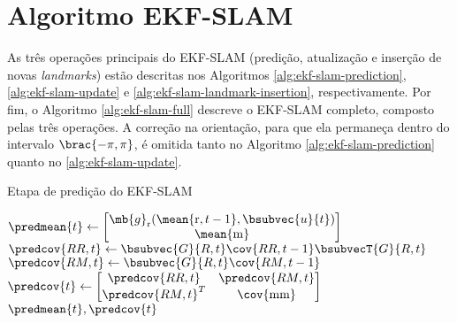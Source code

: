 \section{Algoritmo EKF-SLAM}
\label{app:alg-ekf-slam}
As três operações principais do EKF-SLAM (predição, atualização e inserção de novas \textit{landmarks}) estão descritas nos Algoritmos \ref{alg:ekf-slam-prediction}, \ref{alg:ekf-slam-update} e \ref{alg:ekf-slam-landmark-insertion}, respectivamente. Por fim, o Algoritmo \ref{alg:ekf-slam-full} descreve o EKF-SLAM completo, composto pelas três operações. A correção na orientação, para que ela permaneça dentro do 
intervalo $\brac{-\pi, \pi}$, é omitida tanto no Algoritmo \ref{alg:ekf-slam-prediction} quanto no \ref{alg:ekf-slam-update}.

\begin{algorithm}[h]
  \caption{Etapa de predição do EKF-SLAM}
  \label{alg:ekf-slam-prediction}
\begin{algorithmic}[1]
  \State $\predmean{t} \gets \begin{bmatrix}
    \mb{g}_\mathrm{r}(\mean{\mathrm{r},t-1}, \bsubvec{u}{t}) \\ \mean{\mathrm{m}}
  \end{bmatrix}$
  \State $\predcov{RR,t} \gets \bsubvec{G}{R, t}\cov{RR, t-1} \bsubvecT{G}{R,t}$
  \State $\predcov{RM, t} \gets \bsubvec{G}{R, t} \cov{RM, t-1}$
  \State $\predcov{t} \gets \begin{bmatrix}
    \predcov{RR, t} & \predcov{RM, t} \\
    \predcov{RM, t}^T & \cov{\mathrm{mm}}
  \end{bmatrix}$
  \State \Return $\predmean{t}, \predcov{t}$
\EndProcedure
\end{algorithmic}
\end{algorithm}

